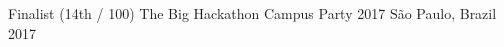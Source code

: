 



\begin{cvhonors}

  \cvhonor
    {Finalist (14th / 100) } %
    {The Big Hackathon Campus Party 2017} %
    {São Paulo, Brazil} %
    {2017} %
\end{cvhonors}

